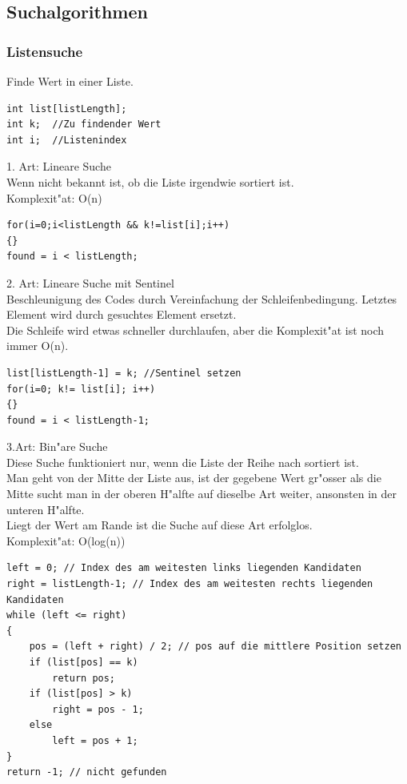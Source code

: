 \subsection{Suchalgorithmen}
\subsubsection{Listensuche}
Finde Wert in einer Liste. 
\begin{lstlisting}[style=C]
int list[listLength];
int k;	//Zu findender Wert 				
int i; 	//Listenindex
\end{lstlisting} 
1. Art: Lineare Suche\\
Wenn nicht bekannt ist, ob die Liste irgendwie sortiert ist. \\
Komplexit"at: O(n)
\begin{lstlisting}[style=C]
for(i=0;i<listLength && k!=list[i];i++)
{}
found = i < listLength; 
\end{lstlisting} 

2. Art: Lineare Suche mit Sentinel\\
Beschleunigung des Codes durch Vereinfachung der Schleifenbedingung. Letztes Element wird durch gesuchtes Element ersetzt.\\
Die Schleife wird etwas schneller durchlaufen, aber die Komplexit"at ist noch immer O(n).
\begin{lstlisting}[style=C]
list[listLength-1] = k; //Sentinel setzen
for(i=0; k!= list[i]; i++)
{}
found = i < listLength-1; 
\end{lstlisting} 

3.Art: Bin"are Suche\\
Diese Suche funktioniert nur, wenn die Liste der Reihe nach sortiert ist.\\
Man geht von der Mitte der Liste aus, ist der gegebene Wert gr"osser als die Mitte sucht man in der oberen H"alfte auf dieselbe Art weiter, ansonsten in der unteren H"alfte.\\
Liegt der Wert am Rande ist die Suche auf diese Art erfolglos.\\
Komplexit"at: O(log(n))\\
\begin{lstlisting}[style=C]
left = 0; // Index des am weitesten links liegenden Kandidaten
right = listLength-1; // Index des am weitesten rechts liegenden Kandidaten
while (left <= right)
{
	pos = (left + right) / 2; // pos auf die mittlere Position setzen
	if (list[pos] == k)
		return pos;
	if (list[pos] > k)
		right = pos - 1;
	else
		left = pos + 1;
}
return -1; // nicht gefunden

\end{lstlisting} 
